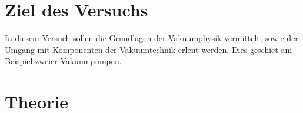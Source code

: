 \section{Ziel des Versuchs}
In diesem Versuch sollen die Grundlagen der Vakuumphysik vermittelt, sowie der Umgang mit Komponenten der Vakuumtechnik erlent werden. 
Dies geschiet am Beispiel zweier Vakuumpumpen.

\section{Theorie}
\label{sec:Theorie}

\cite{sample} \cite{cern} \cite{handbuch}
